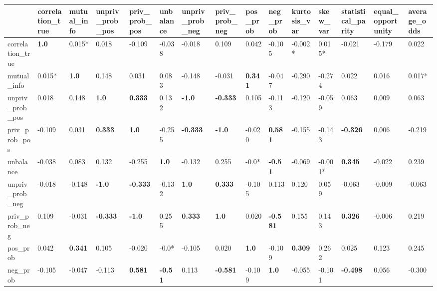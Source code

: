 \begin{tabular}{lllllllllllllll}
\toprule
 & correlation_true & mutual_info & unpriv_prob_pos & priv_prob_pos & unbalance & unpriv_prob_neg & priv_prob_neg & pos_prob & neg_prob & kurtosis_var & skew_var & statistical_parity & equal_opportunity & average_odds \\
\midrule
correlation_true & \cellcolor{black!25}\textbf{1.0} & 0.015* & 0.018 & -0.109 & -0.038 & -0.018 & 0.109 & 0.042 & -0.105 & -0.002* & 0.015* & -0.021 & -0.179 & 0.022 \\
mutual_info & 0.015* & \cellcolor{black!25}\textbf{1.0} & 0.148 & 0.031 & 0.083 & -0.148 & -0.031 & \cellcolor{black!25}\textbf{0.341} & -0.047 & -0.290 & -0.274 & 0.022 & 0.016 & 0.017* \\
unpriv_prob_pos & 0.018 & 0.148 & \cellcolor{black!25}\textbf{1.0} & \cellcolor{black!25}\textbf{0.333} & 0.132 & \cellcolor{black!25}\textbf{-1.0} & \cellcolor{black!25}\textbf{-0.333} & 0.105 & -0.113 & -0.120 & -0.059 & 0.063 & 0.009 & 0.063 \\
priv_prob_pos & -0.109 & 0.031 & \cellcolor{black!25}\textbf{0.333} & \cellcolor{black!25}\textbf{1.0} & -0.255 & \cellcolor{black!25}\textbf{-0.333} & \cellcolor{black!25}\textbf{-1.0} & -0.020 & \cellcolor{black!25}\textbf{0.581} & -0.155 & -0.143 & \cellcolor{black!25}\textbf{-0.326} & 0.006 & -0.219 \\
unbalance & -0.038 & 0.083 & 0.132 & -0.255 & \cellcolor{black!25}\textbf{1.0} & -0.132 & 0.255 & -0.0* & \cellcolor{black!25}\textbf{-0.51} & -0.069 & -0.001* & \cellcolor{black!25}\textbf{0.345} & -0.022 & 0.239 \\
unpriv_prob_neg & -0.018 & -0.148 & \cellcolor{black!25}\textbf{-1.0} & \cellcolor{black!25}\textbf{-0.333} & -0.132 & \cellcolor{black!25}\textbf{1.0} & \cellcolor{black!25}\textbf{0.333} & -0.105 & 0.113 & 0.120 & 0.059 & -0.063 & -0.009 & -0.063 \\
priv_prob_neg & 0.109 & -0.031 & \cellcolor{black!25}\textbf{-0.333} & \cellcolor{black!25}\textbf{-1.0} & 0.255 & \cellcolor{black!25}\textbf{0.333} & \cellcolor{black!25}\textbf{1.0} & 0.020 & \cellcolor{black!25}\textbf{-0.581} & 0.155 & 0.143 & \cellcolor{black!25}\textbf{0.326} & -0.006 & 0.219 \\
pos_prob & 0.042 & \cellcolor{black!25}\textbf{0.341} & 0.105 & -0.020 & -0.0* & -0.105 & 0.020 & \cellcolor{black!25}\textbf{1.0} & -0.109 & \cellcolor{black!25}\textbf{0.309} & 0.262 & 0.025 & 0.123 & 0.245 \\
neg_prob & -0.105 & -0.047 & -0.113 & \cellcolor{black!25}\textbf{0.581} & \cellcolor{black!25}\textbf{-0.51} & 0.113 & \cellcolor{black!25}\textbf{-0.581} & -0.109 & \cellcolor{black!25}\textbf{1.0} & -0.055 & -0.101 & \cellcolor{black!25}\textbf{-0.498} & 0.056 & -0.300 \\

\end{tabular}
